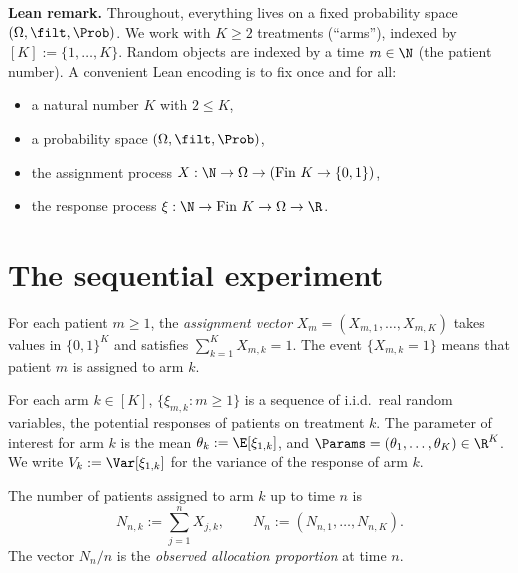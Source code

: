 \textbf{Lean remark.}
Throughout, everything lives on a fixed probability space $(\Omega, \filt, \Prob)$.
We work with $K \geq 2$ treatments (``arms''), indexed by $[K] := \{1, \dots, K\}$.
Random objects are indexed by a time $m \in \N$ (the patient number).
A convenient Lean encoding is to fix once and for all:
\begin{itemize}
  \item a natural number $K$ with $2 \le K$,
  \item a probability space $(\Omega, \filt, \Prob)$,
  \item the assignment process $X : \N \to \Omega \to (\text{Fin } K \to \{0,1\})$,
  \item the response process $\xi : \N \to \text{Fin } K \to \Omega \to \R$.
\end{itemize}

\section{The sequential experiment}
\label{sec:model_experiment}

\begin{definition}\label{def:assignment}
\leanok
For each patient $m \ge 1$, the \emph{assignment vector}
$X_m = (X_{m,1}, \dots, X_{m,K})$ takes values in $\{0,1\}^K$ and satisfies
$\sum_{k=1}^K X_{m,k} = 1$. The event $\{X_{m,k} = 1\}$ means that patient $m$ is
assigned to arm $k$.
\end{definition}

\begin{definition}\label{def:responses}
For each arm $k \in [K]$, $\{\xi_{m,k} : m \ge 1\}$ is a sequence of i.i.d.\
real random variables, the potential responses of patients on treatment $k$.
The parameter of interest for arm $k$ is the mean
$\theta_k := \E[\xi_{1,k}]$, and $\Params = (\theta_1, \dots, \theta_K) \in \R^K$.
We write $V_k := \Var[\xi_{1,k}]$ for the variance of the response of arm $k$.
\end{definition}

\begin{definition}[Allocation counts]\label{def:counts}
\leanok
{}
The number of patients assigned to arm $k$ up to time $n$ is
\[
  N_{n,k} := \sum_{j=1}^n X_{j,k}, \qquad N_n := (N_{n,1}, \dots, N_{n,K}).
\]
The vector $N_n / n$ is the \emph{observed allocation proportion} at time $n$.
\end{definition}

